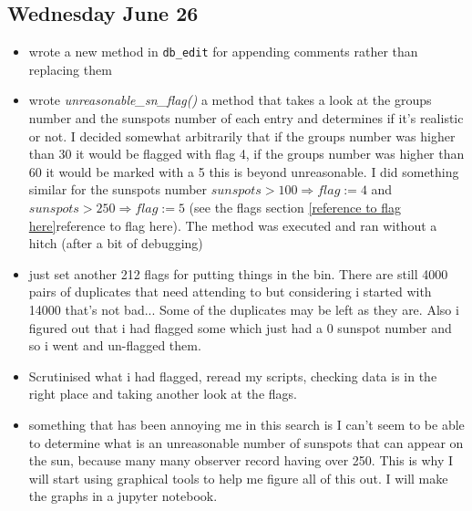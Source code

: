 \documentclass[12pt]{article}
\begin{document}
\subsection{Wednesday June 26}
\begin{itemize}
    \item wrote a new method in \texttt{db\_edit} for appending comments rather than replacing them
    \item wrote \textit{unreasonable\_sn\_flag()} a method that takes a look at the groups number and the sunspots number of each entry and determines if it's realistic or not. I decided somewhat arbitrarily that if the groups number was higher than 30 it would be flagged with flag 4, if the groups number was higher than 60 it would be marked with a 5 this is beyond unreasonable. I did something similar for the sunspots number $sunspots>100\Rightarrow flag:=4$ and $sunspots>250\Rightarrow flag:=5$ (see the flags section \ref{reference to flag here}reference to flag here). The method was executed and ran without a hitch (after a bit of debugging)
    \item just set another 212 flags for putting things in the bin. There are still 4000 pairs of duplicates that need attending to but considering i started with 14000 that's not bad... Some of the duplicates may be left as they are. Also i figured out that i had flagged some which just had a 0 sunspot number and so i went and un-flagged them.
    \item Scrutinised what i had flagged, reread my scripts, checking data is in the right place and taking another look at the flags.
    \item something that has been annoying me in this search is I can't seem to be able to determine what is an unreasonable number of sunspots that can appear on the sun, because many many observer record having over 250. This is why I will start using graphical tools to help me figure all of this out. I will make the graphs in a jupyter notebook.
\end{itemize}
    
\end{document}
